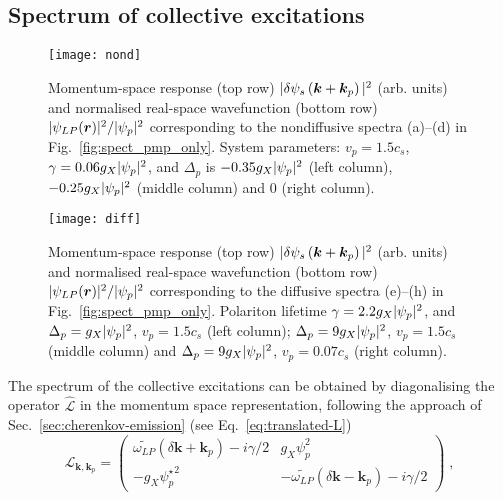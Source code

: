 \subsection{Spectrum of collective excitations}
\label{sec:spect}
%
\begin{figure}[tb]\centering
  \texttt{[image: nond]}
  \caption{
    Momentum-space response (top row) $\vert \delta \psi_s\left(\bm{k} +
        \bm{k}_p \right) \vert^2$ (arb. units) and normalised real-space
    wavefunction (bottom row) $\vert \psi_{LP}(\bm{r}) \vert^2/\vert \psi_p \vert^2$
    corresponding to the nondiffusive spectra (a)--(d) in
    Fig.~\ref{fig:spect_pmp_only}. System parameters: $v_p = 1.5 c_s$,
    $\gamma = 0.06 g_X\vert \psi_p \vert^2$, and $\Delta_p$ is $-0.35
    g_X\vert \psi_p \vert^2$ (left column), $-0.25 g_X\vert \psi_p \vert^2$ (middle
    column) and 0 (right column).
  }\label{fig:nondiffusive}
\end{figure}
%
\begin{figure}[tb]\centering
  \texttt{[image: diff]}
  \caption{
    Momentum-space response (top row) $\vert \delta \psi_s\left(\bm{k} +
        \bm{k}_p \right) \vert^2$ (arb. units) and normalised real-space
    wavefunction (bottom row) $\vert \psi_{LP}(\bm{r}) \vert^2/\vert \psi_p \vert^2$
    corresponding to the diffusive spectra (e)--(h) in
    Fig.~\ref{fig:spect_pmp_only}. Polariton lifetime $\gamma = 2.2
    g_X\vert \psi_p \vert^2$, and $\Delta_p = g_X\vert \psi_p \vert^2$, $v_p = 1.5 c_s$
    (left column); $\Delta_p = 9 g_X\vert \psi_p \vert^2$, $v_p = 1.5 c_s$ (middle
    column) and $\Delta_p = 9 g_X\vert \psi_p \vert^2$, $v_p = 0.07 c_s$ (right
    column).
  }\label{fig:diffusive}
\end{figure}
%
The spectrum of the collective excitations can be obtained by
diagonalising the operator $\hat{\mathcal{L}}$ in the momentum space
representation, following the approach of
Sec.~\ref{sec:cherenkov-emission} (see Eq.~\eqref{eq:translated-L})
%
\begin{equation}
  \mathcal{L}_{\bm{k},\bm{k}_p} = \begin{pmatrix}
    \widetilde{\omega_{LP}} (\delta \bm{k}+\bm{k}_p) - i \gamma/2 &
    g_X \psi_p^2 \\ -g_X {\psi_p^{\star}}^2 & -
    \widetilde{\omega_{LP}}(\delta \bm{k}-\bm{k}_p) -
    i\gamma/2 \end{pmatrix}\; ,
\label{eq:opell}
\end{equation}
